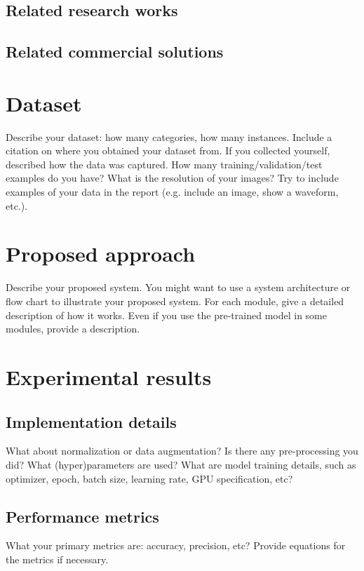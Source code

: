 \documentclass{article}
\begin{document}
\subsection{Related research works}

\subsection{Related commercial solutions}

\section{Dataset}
Describe your dataset: how many categories, how many instances. Include a citation on where you obtained your dataset from. If you collected yourself, described how the data was captured. How many training/validation/test examples do you have?  What is the resolution of your images?  Try to include examples of your data in the report (e.g. include an image, show a waveform, etc.).


\section{Proposed approach}
Describe your proposed system. You might want to use a system architecture or flow chart to illustrate your proposed system. For each module, give a detailed description of how it works. Even if you use the pre-trained model in some modules, provide a description.

\section{Experimental results}

\subsection{Implementation details}

What about normalization or data augmentation? Is there any pre-processing you did? What (hyper)parameters are used? What are model training details, such as optimizer, epoch, batch size, learning rate, GPU specification, etc?

\subsection{Performance metrics}
What your primary metrics are: accuracy, precision, etc? Provide equations for the metrics if necessary.
\end{document}
